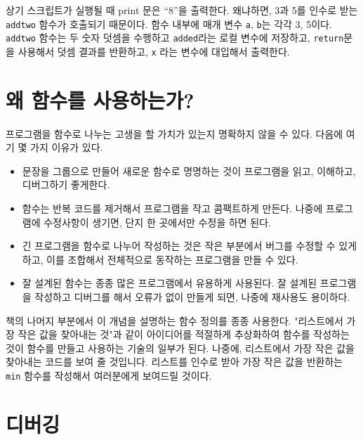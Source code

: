 상기 스크립트가 실행될 때 print 문은 ``8''을 출력한다. 
왜냐하면, 3과 5를 인수로 받는 {\tt addtwo} 함수가 호출되기 때문이다.
함수 내부에 매개 변수 {\tt a}, {\tt b}는 각각 3, 5이다.
{\tt addtwo} 함수는 두 숫자 덧셈을 수행하고 {\tt added}라는 로컬 변수에 저장하고, {\tt return}문을 사용해서 덧셈 결과를 반환하고,
{\tt x} 라는 변수에 대입해서 출력한다.

\section{왜 함수를 사용하는가?}

프로그램을 함수로 나누는 고생을 할 가치가 있는지 명확하지 않을 수 있다. 다음에 여기 몇 가지 이유가 있다.

\begin{itemize}

\item 문장을 그룹으로 만들어 새로운 함수로 명명하는 것이 프로그램을 읽고, 이해하고, 디버그하기 좋게한다. 

\item 함수는 반복 코드를 제거해서 프로그램을 작고 콤팩트하게 만든다. 나중에 프로그램에 수정사항이 생기면, 단지 한 곳에서만 수정을 하면 된다.

\item 긴 프로그램을 함수로 나누어 작성하는 것은 작은 부분에서 버그를 수정할 수 있게 하고, 이를 조합해서 전체적으로 동작하는 프로그램을 만들 수 있다.

\item 잘 설계된 함수는 종종 많은 프로그램에서 유용하게 사용된다. 잘 설계된 프로그램을 작성하고 디버그를 해서 오류가 없이 만들게 되면, 나중에 재사용도 용이하다.

\end{itemize}

책의 나머지 부분에서 이 개념을 설명하는 함수 정의를 종종 사용한다. 
"리스트에서 가장 작은 값을 찾아내는 것"과 같이 아이디어를 적절하게 추상화하여 함수를 작성하는 것이 함수를 만들고 사용하는 기술의 일부가 된다. 
나중에, 리스트에서 가장 작은 값을 찾아내는 코드를 보여 줄 것입니다. 리스트를 인수로 받아 가장 작은 값을 
반환하는 {\tt min} 함수를 작성해서 여러분에게 보여드릴 것이다.

\section{디버깅}
\label{editor}

